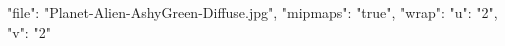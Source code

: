{
	"file": "Planet-Alien-AshyGreen-Diffuse.jpg",
    "mipmaps": "true",
	"wrap": { 
		"u": "2", 
		"v": "2"
	}
}